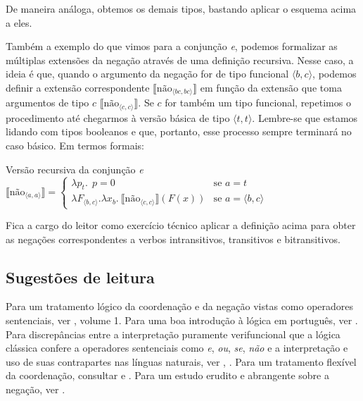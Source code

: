 \n De maneira análoga, obtemos os demais tipos, bastando aplicar o esquema acima a eles.  

Também a exemplo do que vimos para a conjunção \textit{e}, podemos formalizar as múltiplas extensões da negação através de uma definição recursiva. Nesse caso, a ideia é que, quando o argumento da negação for de tipo funcional $\langle b,c\rangle$, podemos definir a extensão correspondente $\llbracket \text{não}_{\langle bc,bc\rangle} \rrbracket$ em função da extensão que toma argumentos de tipo $c$ $\llbracket \text{não}_{\langle c,c\rangle} \rrbracket$. Se $c$ for também um tipo funcional, repetimos o procedimento até chegarmos à versão básica de tipo $\langle t,t\rangle$. Lembre-se que estamos lidando com tipos booleanos e que, portanto, esse processo sempre terminará no caso básico. Em termos formais:

\begin{exe}
	\ex Versão recursiva da conjunção \textit{e}\\
	$\llbracket \text{não}_{\langle a,a\rangle}\rrbracket =
	\begin{cases}
	\lambda p_{t}.\ \ p=0 & \text{se } a =
	t\\
	\lambda F_{\langle b,c\rangle}.\lambda x_{b}.\ \llbracket
	\text{não}_{\langle c,c\rangle}\rrbracket (F(x)) &
	\text{se } a = \langle b,c\rangle
	\end{cases}$	
\end{exe}

\n Fica a cargo do leitor como exercício técnico aplicar a definição acima para obter as negações correspondentes a verbos intransitivos, transitivos e bitransitivos.

\bigskip

\begin{tcolorbox}[parbox=false,boxrule=0pt,sharp corners,breakable]

\section*{Sugestões de leitura}

\n Para um tratamento lógico da coordenação e da negação vistas como operadores sentenciais, ver \cite{gamut91}, volume 1. Para uma boa introdução à lógica em português, ver \cite{mortari16}. Para discrepâncias entre a interpretação puramente verifuncional que a lógica clássica confere a operadores sentenciais como \textit{e}, \textit{ou}, \textit{se}, \textit{não} e a interpretação e uso de suas contrapartes nas línguas naturais, ver \cite{grice89}, \cite{gamut91}. Para um tratamento flexível da coordenação, consultar \cite{gazdar80} e \cite{parroo83}. Para um estudo erudito e abrangente sobre a negação, ver \cite{horn89}.

\end{tcolorbox}

